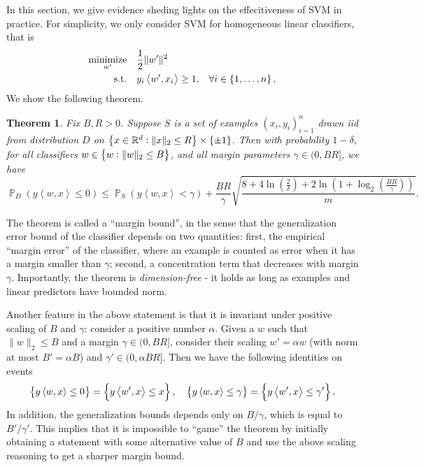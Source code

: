 \documentclass{article}
\newtheorem{theorem}{Theorem}
\DeclareMathOperator*{\minimize}{{\rm minimize}}
\DeclareMathOperator*{\st}{{\rm s.t.}}
\DeclareMathOperator{\PP}{{\mathbb P}}
\newcommand{\RR}{\mathbb{R}} %
\newcommand{\inner}[2]{\left\langle #1,#2 \right\rangle}
\begin{document}
 In this section, we give evidence sheding lights on the effecitiveness of
  SVM in practice. For simplicity, we only consider SVM for homogeneous linear classifiers, that is
  \begin{align}
    \minimize_{w'} \quad & \frac12 \| w' \|^2 & \label{eqn:svm-h} \\
      \st \quad &  y_i \inner{w'}{x_i} \geq 1, &\forall i \in \cbr{1,\ldots,n}, \nonumber
  \end{align}
  We show the following theorem.

\begin{theorem}
Fix $B, R > 0$. Suppose $S$ is a set of examples $(x_i,y_i)_{i=1}^n$ drawn iid from distribution $D$ on $\cbr{x \in \RR^d: \| x \|_2 \leq R} \times \cbr{\pm 1}$.
Then with probability $1-\delta$, for all classifiers $w \in \cbr{w: \|w\|_2 \leq B}$, and all margin parameters
$\gamma \in (0, BR]$, we have
\[
\PP_D( y \inner{w}{x} \leq 0 )
\leq \PP_S (y \inner{w}{x} < \gamma) + \frac{BR}{\gamma} \sqrt{\frac{8 + 4\ln(\frac{2}{\delta}) + 2\ln(1+\log_2(\frac{BR}{\gamma}))}{m}}.
\]
\label{thm:mb-l2}
\end{theorem}

The theorem is called a ``margin bound'', in the sense that the generalization error bound of the classifier depends on two quantities: first, the empirical ``margin error'' of the classifier, where an example is counted as error when it has a margin smaller than $\gamma$; second, a concentration term that decreases with margin $\gamma$. Importantly, the theorem is {\em dimension-free} - it holds as long as examples and linear predictors have bounded norm.

Another feature in the above statement is that it is invariant under positive scaling of $B$ and $\gamma$: consider a positive number $\alpha$. Given a $w$ such that $\| w \|_2 \leq B$ and a margin $\gamma \in (0, BR]$, consider their scaling $w' = \alpha w$ (with norm at most $B' = \alpha B$)  and $\gamma' \in (0,\alpha BR]$. Then we have the following identities on events
\[ \cbr{y \inner{w}{x} \leq 0} = \cbr{y \inner{w'}{x} \leq x },
\quad \cbr{y \inner{w}{x} \leq \gamma} = \cbr{y \inner{w'}{x} \leq \gamma'}. \]
In addition, the generalization bounds depends only on $B/\gamma$, which is equal
to $B'/\gamma'$. This implies that it is impossible to ``game'' the theorem by initially obtaining a statement with some alternative value of $B$ and use the above scaling reasoning to get a sharper margin bound.
\end{document}
